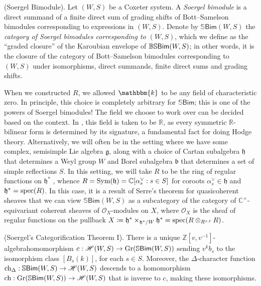 \noindent\begin{definition}\textup{(Soergel Bimodule).} Let $(W, S)$ be a Coxeter system. A {\em Soergel bimodule} is a direct summand of a finite direct sum of grading shifts of Bott--Samelson bimodules corresponding to expressions in $(W, S)$. Denote by $\mathbb{S}\textsf{Bim}(W, S)$ the {\em category of Soergel bimodules corresponding to $(W, S)$}, which we define as the ``graded closure'' of the Karoubian envelope of $\mathbb{BS}\textup{\textsf{Bim}}(W, S)$; in other words, it is the closure of the category of Bott--Samelson bimodules corresponding to $(W, S)$ under isomorphisms, direct summands, finite direct sums and grading shifts.\\
\end{definition}

\noindent\begin{remark} When we constructed $R$, we allowed $\mathbbm{k}$ to be any field of characteristic zero. In principle, this choice is completely arbitrary for $\mathbb{S}\textsf{Bim}$; this is one of the powers of Soergel bimodules! The field we choose to work over can be decided based on the context. In \cite{EMTW20}, this field is taken to be $\mathbb{R}$, as every symmetric $\mathbb{R}$-bilinear form is determined by its signature, a fundamental fact for doing Hodge theory. Alternatively, we will often be in the setting where we have some complex, semisimple Lie algebra $\mathfrak{g}$, along with a choice of Cartan subalgebra $\mathfrak{h}$ that determines a Weyl group $W$ and Borel subalgebra $\mathfrak{b}$ that determines a set of simple reflections $S$. In this setting, we will take $R$ to be the ring of regular functions on $\mathfrak{h}^*$%
, whence $R = \textup{Sym}(\mathfrak{h}) = \mathbb{C}[\alpha_s^\vee : s \in S]$ for coroots $\alpha_s^\vee \in \mathfrak{h}$ and $\mathfrak{h}^* = \textup{spec}(R)$. In this case, it is a result of Serre's theorem for quasicoherent sheaves that we can view $\mathbb{S}\textsf{Bim}(W, S)$ as a subcategory of the category of $\mathbb{C}^\times$-equivariant coherent sheaves of $\mathscr{O}_X$-modules on $X$, where $\mathscr{O}_X$ is the sheaf of regular functions on the pullback ${X \coloneqq \mathfrak{h}^* \times_{\mathfrak{h}^*/W} \mathfrak{h}^* = \textup{spec}(R \otimes_{R^{s,t}} R)}$.\\
\end{remark}

\noindent\begin{theorem}\textup{(Soergel's Categorification Theorem I).}\label{SoergelCategorification} There is a unique $\mathbb{Z}[v, v^{-1}]$-algebra\linebreak homomorphism $c : \mathscr{H}(W, S) \to \textup{Gr}(\mathbb{S}\textup{\textsf{Bim}}(W, S))$ sending $v^k b_s$ to the isomorphism class $[B_s(k)]$, for each $s \in S$. Moreover, the $\Delta$-character function $\textup{ch}_\Delta : \mathbb{S}\textup{\textsf{Bim}}(W, S) \to \mathscr{H}(W, S)$ descends to a homomorphism $\textup{ch} : \textup{Gr}(\mathbb{S}\textup{\textsf{Bim}}(W, S)) \to \mathscr{H}(W, S)$ that is inverse to $c$, making these isomorphisms.\\
\end{theorem}

